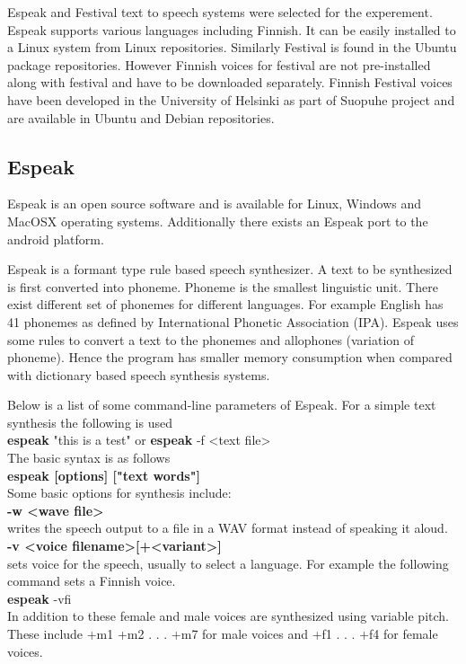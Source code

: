 \documentclass[11pt,a4paper,oneside,article]{memoir}
\begin{document}
Espeak and Festival text to speech systems were selected for the experement. Espeak supports various languages including Finnish. It can be easily installed to a Linux system from Linux repositories. Similarly Festival is found in the Ubuntu  package repositories. However Finnish voices for festival are not pre-installed along with festival and have to be downloaded separately. Finnish Festival voices have been developed in the University of Helsinki as part of Suopuhe project and are available in Ubuntu and Debian repositories. 


\subsection{Espeak}

Espeak is an open source software and is available for Linux, Windows and MacOSX operating systems. Additionally there exists an Espeak port to the android platform. 

Espeak is a formant type rule based speech synthesizer. A text to be synthesized is first converted into phoneme. Phoneme is the smallest linguistic unit. There exist different set of phonemes for different languages. For example English has 41 phonemes as defined by International Phonetic Association (IPA). Espeak uses some rules to convert a text to the phonemes and allophones (variation of phoneme). Hence the program has smaller memory consumption when compared with dictionary based speech synthesis systems.


Below is a list of some command-line parameters of Espeak. For a simple text synthesis the following is used\\
\textbf{espeak} "this is a test" or \textbf{espeak} -f <text file>\\
The basic syntax is as follows\\
\textbf{espeak [options] ["text words"]}\\
Some basic options for synthesis include:\\
\textbf{-w <wave file>}\\
writes the speech output to a file in a WAV format instead of speaking it aloud.\\ 
\textbf{-v <voice filename>[+<variant>]}\\
sets voice for the speech, usually to select a language. For example the following command sets a Finnish voice.\\
\textbf{espeak} -vfi\\
In addition to these female and male voices are synthesized using variable pitch. These include +m1 +m2 . . . +m7 for male voices and +f1 . . . +f4 for female voices.
\end{document}
